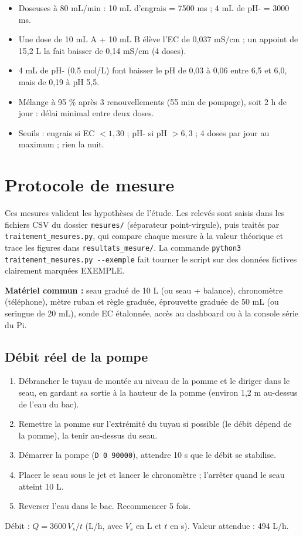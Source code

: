 \documentclass[11pt,a4paper]{article}
\begin{document}
\begin{resume}
\begin{itemize}
  \item Doseuses à 80 mL/min : 10 mL d'engrais = 7500 ms ; 4 mL de pH- = 3000 ms.
  \item Une dose de 10 mL A + 10 mL B élève l'EC de 0,037 mS/cm ; un appoint de 15,2 L la fait baisser de 0,14 mS/cm (4 doses).
  \item 4 mL de pH- (0,5 mol/L) font baisser le pH de 0,03 à 0,06 entre 6,5 et 6,0, mais de 0,19 à pH 5,5.
  \item Mélange à 95 \% après 3 renouvellements (55 min de pompage), soit 2 h de jour : délai minimal entre deux doses.
  \item Seuils : engrais si EC $< 1{,}30$ ; pH- si pH $> 6{,}3$ ; 4 doses par jour au maximum ; rien la nuit.
\end{itemize}
\end{resume}

\newpage
\section{Protocole de mesure}
Ces mesures valident les hypothèses de l'étude. Les relevés sont saisis dans les fichiers CSV du dossier \texttt{mesures/} (séparateur point-virgule), puis traités par \texttt{traitement\_mesures.py}, qui compare chaque mesure à la valeur théorique et trace les figures dans \texttt{resultats\_mesure/}. La commande \texttt{python3 traitement\_mesures.py -{}-exemple} fait tourner le script sur des données fictives clairement marquées EXEMPLE.

\textbf{Matériel commun :} seau gradué de 10 L (ou seau + balance), chronomètre (téléphone), mètre ruban et règle graduée, éprouvette graduée de 50 mL (ou seringue de 20 mL), sonde EC étalonnée, accès au dashboard ou à la console série du Pi.

\subsection{Débit réel de la pompe}
\begin{enumerate}
  \item Débrancher le tuyau de montée au niveau de la pomme et le diriger dans le seau, en gardant sa sortie à la hauteur de la pomme (environ 1,2 m au-dessus de l'eau du bac).
  \item Remettre la pomme sur l'extrémité du tuyau si possible (le débit dépend de la pomme), la tenir au-dessus du seau.
  \item Démarrer la pompe (\texttt{D 0 90000}), attendre 10 s que le débit se stabilise.
  \item Placer le seau sous le jet et lancer le chronomètre ; l'arrêter quand le seau atteint 10 L.
  \item Reverser l'eau dans le bac. Recommencer 5 fois.
\end{enumerate}
Débit : $Q = 3600\,V_s/t$ (L/h, avec $V_s$ en L et $t$ en s). Valeur attendue : 494 L/h.
\end{document}
